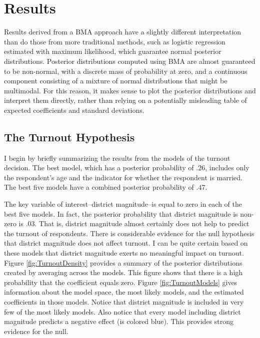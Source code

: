 \documentclass[12pt]{article}
\begin{document}
\section*{Results}

Results derived from a BMA approach have a slightly different interpretation than do those from more traditional methods, such as logistic regression estimated with maximum likelihood, which guarantee normal posterior distributions. Posterior distributions computed using BMA are almost guaranteed to be non-normal, with a discrete mass of probability at zero, and a continuous component consisting of a mixture of normal distributions that might be multimodal. For this reason, it makes sense to plot the posterior distributions and interpret them directly, rather than relying on a potentially misleading table of expected coefficients and standard deviations.

\subsection*{The Turnout Hypothesis}

I begin by briefly summarizing the results from the models of the turnout decision. The best model, which has a posterior probability of $.26$, includes only the respondent's age and the indicator for whether the respondent is married. The best five models have a combined posterior probability of $.47$.

The key variable of interest--district magnitude--is equal to zero in each of the best five models. In fact, the posterior probability that district magnitude is non-zero is $.03$. That is, district magnitude almost certainly does not help to predict the turnout of respondents. There is considerable evidence for the null hypothesis that district magnitude does not affect turnout. I can be quite certain based on these  models that district magnitude exerts no meaningful impact on turnout. Figure \ref{fig:TurnoutDensity} provides a summary of the posterior distributions created by averaging across the models. This figure shows that there is a high probability that the coefficient equals zero. Figure \ref{fig:TurnoutModels} gives information about the model space, the most likely models, and the estimated coefficients in those models. Notice that district magnitude is included in very few of the most likely models. Also notice that every model including district magnitude predicts a negative effect (is colored blue). This provides strong evidence for the null. 
\end{document}
